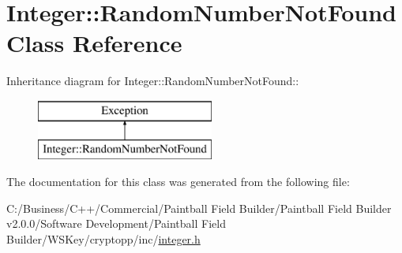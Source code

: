 \hypertarget{class_integer_1_1_random_number_not_found}{
\section{Integer::RandomNumberNotFound Class Reference}
\label{class_integer_1_1_random_number_not_found}
}
Inheritance diagram for Integer::RandomNumberNotFound::\begin{figure}[H]
\begin{center}
\leavevmode
\includegraphics[height=2cm]{class_integer_1_1_random_number_not_found}
\end{center}
\end{figure}


The documentation for this class was generated from the following file:\begin{DoxyCompactItemize}
\item 
C:/Business/C++/Commercial/Paintball Field Builder/Paintball Field Builder v2.0.0/Software Development/Paintball Field Builder/WSKey/cryptopp/inc/\hyperlink{integer_8h}{integer.h}\end{DoxyCompactItemize}
